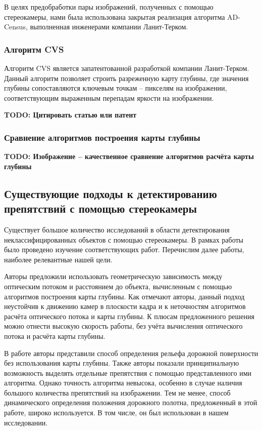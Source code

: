 \documentclass[aps,%
14pt,%
final,%
oneside,
onecolumn,%
musixtex, %
superscriptaddress,%
centertags]{extarticle} %
\begin{document}
В целях предобработки пары изображений, полученных с помощью стереокамеры, нами была использована закрытая реализация алгоритма AD-Census, выполненная инженерами компании Ланит-Терком.


\subsubsection{Алгоритм CVS}
Алгоритм CVS является запатентованной разработкой компании Ланит-Терком. Данный алгоритм позволяет строить разреженную карту глубины, где значения глубины сопоставляются ключевым точкам -- пикселям на изображении, соответствующим выраженным перепадам яркости на изображении.

\textbf{\Large \color{Red} TODO: Цитировать статью или патент}

\subsubsection{Сравнение алгоритмов построения карты глубины}

\textbf{\Large \color{Red} TODO: Изображение -- качественное сравнение алгоритмов расчёта карты глубины}

\subsection{Существующие подходы к детектированию препятствий с помощью стереокамеры}

Существует большое количество исследований в области детектирования неклассифицированных объектов с помощью стереокамеры. В рамках работы было проведено изучение соответствующих работ. Перечислим далее работы, наиболее  релевантные нашей цели.

Авторы \cite{heinrich2002fast} предложили использовать геометрическую зависимость между оптическим потоком и расстоянием до объекта, вычисленным с помощью алгоритмов построения карты глубины. Как отмечают авторы, данный подход неустойчив к движению камер в плоскости кадра и к неточностям алгоритмов расчёта оптического потока и карты глубины. К плюсам предложенного решения можно отнести высокую скорость работы, без учёта вычисления оптического потока и расчёта карты глубины.

В работе \cite{labayrade2002real} авторы представили способ определения рельефа дорожной поверхности без использования карты глубины. Также авторы показали принципиальную возможность выделять отдельные препятствия с помощью представленного ими алгоритма. Однако точность алгоритма невысока, особенно в случае наличия большого количества препятствий на изображении. Тем не менее, способ динамического определения положения дорожного полотна, предложенный в этой работе, широко используется. В том числе, он был использован в нашем исследовании.
\end{document}
